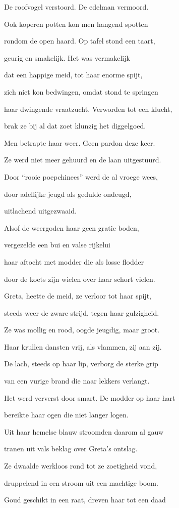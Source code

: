 De roofvogel verstoord.
De edelman vermoord.

Ook koperen potten
kon men hangend spotten

rondom de open haard.
Op tafel stond een taart,

geurig en smakelijk.
Het was vermakelijk

dat een happige meid,
tot haar enorme spijt,

zich niet kon bedwingen,
omdat stond te springen

haar dwingende vraatzucht.
Verworden tot een klucht,

brak ze bij al dat zoet
klunzig het diggelgoed.

Men betrapte haar weer.
Geen pardon deze keer.

Ze werd niet meer gehuurd
en de laan uitgestuurd.

Door “rooie poepchinees”
werd de al vroege wees,

door adellijke jeugd
als gedulde ondeugd,

uitlachend uitgezwaaid.

Alsof de weergoden
haar geen gratie boden,

vergezelde een bui
en valse rijkelui

haar aftocht met modder
die als losse flodder

door de koets zijn wielen
over haar schort vielen.

Greta, heette de meid,
ze verloor tot haar spijt,

steeds weer de zware strijd,
tegen haar gulzigheid.

Ze was mollig en rood,
oogde jeugdig, maar groot.

Haar krullen dansten vrij,
als vlammen, zij aan zij.

De lach, steeds op haar lip,
verborg de sterke grip

van een vurige brand
die naar lekkers verlangt.

Het werd ververst door smart.
De modder op haar hart

bereikte haar ogen
die niet langer logen.

Uit haar hemelse blauw
stroomden daarom al gauw

tranen uit vals beklag
over Greta’s ontslag.

Ze dwaalde werkloos rond
tot ze zoetigheid vond,

druppelend in een stroom
uit een machtige boom.

Goud geschikt in een raat,
dreven haar tot een daad

